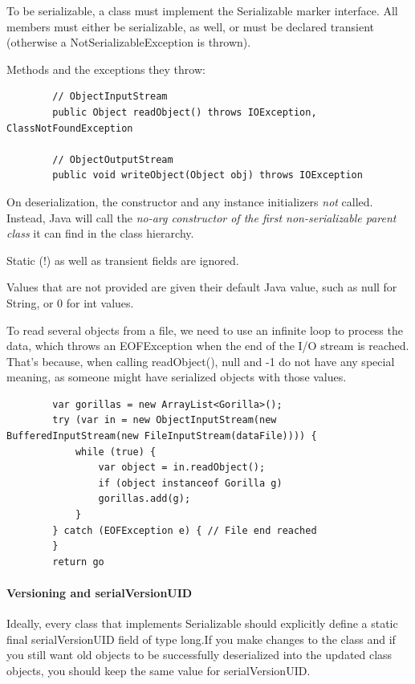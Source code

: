 \documentclass{scrartcl}
\begin{document}
    To be serializable, a class must implement the Serializable marker interface.
    All members must either be serializable, as well, or must be declared transient (otherwise
    a NotSerializableException is thrown).

    Methods and the exceptions they throw:

    \begin{lstlisting}
        // ObjectInputStream
        public Object readObject() throws IOException, ClassNotFoundException

        // ObjectOutputStream
        public void writeObject(Object obj) throws IOException
    \end{lstlisting}

    On deserialization, the constructor and any instance initializers \textit{not} called.
    Instead, Java will call the \textit{no-­arg constructor of the first non-serializable parent class} it can find in the class hierarchy.

    Static (!) as well as transient fields are ignored.

    Values that are not provided are  given their default Java value, such as null for String, or 0 for int values.

    To read several objects from a file, we need to use an infinite loop to process the data,
    which throws an EOFException when the end of the I/O stream is reached. That's because, when calling readObject(), null and -­1 do not have any special meaning,
    as someone might have serialized objects with those values.

    \begin{lstlisting}
        var gorillas = new ArrayList<Gorilla>();
        try (var in = new ObjectInputStream(new BufferedInputStream(new FileInputStream(dataFile)))) {
            while (true) {
                var object = in.readObject();
                if (object instanceof Gorilla g)
                gorillas.add(g);
            }
        } catch (EOFException e) { // File end reached
        }
        return go
    \end{lstlisting}

    \paragraph{Versioning and serialVersionUID}

    Ideally, every class that implements Serializable should explicitly define a static final serialVersionUID field of type long.If you make changes to the class and if you still want old objects to be successfully deserialized into the updated class objects, you should keep the same value for serialVersionUID.
\end{document}
